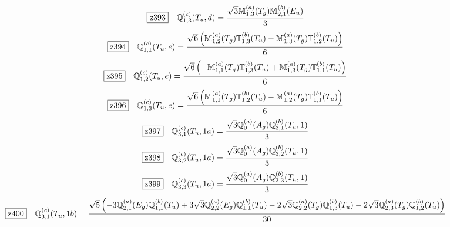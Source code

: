 \documentclass[fleqn,10pt,landscape]{jsarticle}
\begin{document}
\begin{dmath*}
\hspace*{3mm}\fbox{z393}\quad \mathbb{Q}_{1,3}^{(c)}(T_{u},d)=\frac{\sqrt{3} \mathbb{M}_{1,3}^{(a)}(T_{g}) \mathbb{M}_{2,1}^{(b)}(E_{u})}{3}
\end{dmath*}
\begin{dmath*}
\hspace*{3mm}\fbox{z394}\quad \mathbb{Q}_{1,1}^{(c)}(T_{u},e)=\frac{\sqrt{6} \left(\mathbb{M}_{1,2}^{(a)}(T_{g}) \mathbb{T}_{1,3}^{(b)}(T_{u}) - \mathbb{M}_{1,3}^{(a)}(T_{g}) \mathbb{T}_{1,2}^{(b)}(T_{u})\right)}{6}
\end{dmath*}
\begin{dmath*}
\hspace*{3mm}\fbox{z395}\quad \mathbb{Q}_{1,2}^{(c)}(T_{u},e)=\frac{\sqrt{6} \left(- \mathbb{M}_{1,1}^{(a)}(T_{g}) \mathbb{T}_{1,3}^{(b)}(T_{u}) + \mathbb{M}_{1,3}^{(a)}(T_{g}) \mathbb{T}_{1,1}^{(b)}(T_{u})\right)}{6}
\end{dmath*}
\begin{dmath*}
\hspace*{3mm}\fbox{z396}\quad \mathbb{Q}_{1,3}^{(c)}(T_{u},e)=\frac{\sqrt{6} \left(\mathbb{M}_{1,1}^{(a)}(T_{g}) \mathbb{T}_{1,2}^{(b)}(T_{u}) - \mathbb{M}_{1,2}^{(a)}(T_{g}) \mathbb{T}_{1,1}^{(b)}(T_{u})\right)}{6}
\end{dmath*}
\begin{dmath*}
\hspace*{3mm}\fbox{z397}\quad \mathbb{Q}_{3,1}^{(c)}(T_{u},1a)=\frac{\sqrt{3} \mathbb{Q}_{0}^{(a)}(A_{g}) \mathbb{Q}_{3,1}^{(b)}(T_{u},1)}{3}
\end{dmath*}
\begin{dmath*}
\hspace*{3mm}\fbox{z398}\quad \mathbb{Q}_{3,2}^{(c)}(T_{u},1a)=\frac{\sqrt{3} \mathbb{Q}_{0}^{(a)}(A_{g}) \mathbb{Q}_{3,2}^{(b)}(T_{u},1)}{3}
\end{dmath*}
\begin{dmath*}
\hspace*{3mm}\fbox{z399}\quad \mathbb{Q}_{3,3}^{(c)}(T_{u},1a)=\frac{\sqrt{3} \mathbb{Q}_{0}^{(a)}(A_{g}) \mathbb{Q}_{3,3}^{(b)}(T_{u},1)}{3}
\end{dmath*}
\begin{dmath*}
\hspace*{3mm}\fbox{z400}\quad \mathbb{Q}_{3,1}^{(c)}(T_{u},1b)=\frac{\sqrt{5} \left(- 3 \mathbb{Q}_{2,1}^{(a)}(E_{g}) \mathbb{Q}_{1,1}^{(b)}(T_{u}) + 3 \sqrt{3} \mathbb{Q}_{2,2}^{(a)}(E_{g}) \mathbb{Q}_{1,1}^{(b)}(T_{u}) - 2 \sqrt{3} \mathbb{Q}_{2,2}^{(a)}(T_{g}) \mathbb{Q}_{1,3}^{(b)}(T_{u}) - 2 \sqrt{3} \mathbb{Q}_{2,3}^{(a)}(T_{g}) \mathbb{Q}_{1,2}^{(b)}(T_{u})\right)}{30}
\end{dmath*}
\end{document}
